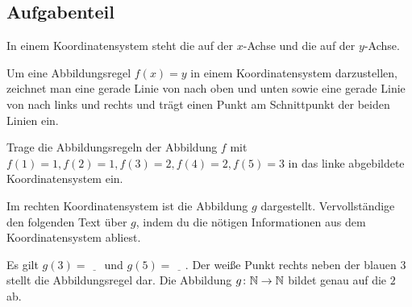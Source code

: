 \documentclass[]{uebungsblatt}
\begin{document}
\subsection*{Aufgabenteil}
\begin{exercise}
    In einem Koordinatensystem steht die  auf der $x$-Achse und die  auf der $y$-Achse.
    
    Um eine Abbildungsregel $f(x)=y$ in einem Koordinatensystem darzustellen, zeichnet man eine gerade Linie von  nach oben und unten sowie eine gerade Linie von  nach links und rechts und trägt einen Punkt am Schnittpunkt der beiden Linien ein. 
\end{exercise}
\begin{exercise}
    Trage die Abbildungsregeln der Abbildung $f$ mit $f(1)=1, f(2)=1, f(3)=2, f(4)=2, f(5)=3$ in das linke abgebildete Koordinatensystem ein.
    
    \begin{multicols}{2}
        \centering
    \end{multicols}
\end{exercise}
\begin{exercise}
    Im rechten Koordinatensystem ist die Abbildung $g$ dargestellt. Vervollständige den folgenden Text über $g$, indem du die nötigen Informationen aus dem Koordinatensystem abliest.
    
    Es gilt $g(3)=\underline{~~~~~}$ und $g(5)=\underline{~~~~~}$. Der weiße Punkt rechts neben der blauen $3$ stellt die Abbildungsregel  dar. Die Abbildung $g\colon\mathbb{N}\rightarrow\mathbb{N}$ bildet genau  auf die $2$ ab.
\end{exercise}
\end{document}
